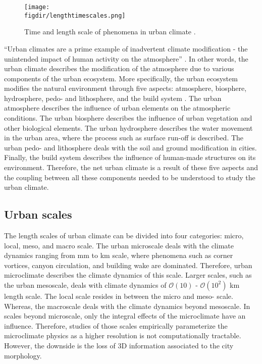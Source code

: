 \begin{figure}[p]
	\centering
	\texttt{[image: \\figdir/lengthtimescales.png]}
	\caption{Time and length scale of phenomena in urban climate \citep{Oke2017a}.}
	\label{fig:lengthtimescales}
\end{figure}


``Urban climates are a prime example of inadvertent climate modification - the unintended impact of human activity on the atmosphere'' \citep{Oke2017a}. In other words, the urban climate describes the modification of the atmosphere due to various components of the urban ecosystem. More specifically, the urban ecosystem modifies the natural environment through five aspects: atmosphere, biosphere, hydrosphere, pedo- and lithosphere, and the build system \citep{Oke2017a}. The urban atmosphere describes the influence of urban elements on the atmospheric conditions. The urban biosphere describes the influence of urban vegetation and other biological elements. The urban hydrosphere describes the water movement in the urban area, where the process such as surface run-off is described. The urban pedo- and lithosphere deals with the soil and ground modification in cities. Finally, the build system describes the influence of human-made structures on its environment. Therefore, the net urban climate is a result of these five aspects and the coupling between all these components needed to be understood to study the urban climate.




\subsection{Urban scales}

The length scales of urban climate can be divided into four categories: micro, local, meso, and macro scale. The urban microscale deals with the climate dynamics ranging from mm to km scale, where phenomena such as corner vortices, canyon circulation, and building wake are dominated. Therefore, urban microclimate describes the climate dynamics of this scale. Larger scales, such as the urban mesoscale, deals with climate dynamics of $\mathcal{O}(10)$ - $\mathcal{O}(10^2)$ km length scale. The local scale resides in between the micro and meso- scale. Whereas, the macroscale deals with the climate dynamics beyond mesoscale. In scales beyond microscale, only the integral effects of the microclimate have an influence. Therefore, studies of those scales empirically parameterize the microclimate physics as a higher resolution is not computationally tractable.  However, the downside is the loss of 3D information associated to the city morphology. 

